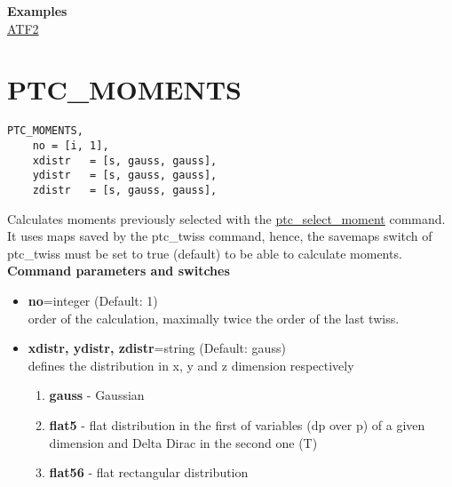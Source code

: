 {\bf Examples}\\
\href{http://cern.ch/frs/mad-X_examples/ptc_madx_interface/moments/moments.madx}{ATF2}

 
% 



%

\section{PTC\_MOMENTS}

\begin{verbatim}
PTC_MOMENTS, 
    no = [i, 1], 
    xdistr   = [s, gauss, gauss], 
    ydistr   = [s, gauss, gauss], 
    zdistr   = [s, gauss, gauss], 
\end{verbatim}

Calculates moments previously selected with the
\href{PTC_SelectMoment.html}{ptc\_select\_moment} command.  It uses maps
saved by the ptc\_twiss command, hence, the savemaps switch of
ptc\_twiss must be set to true (default) to be able to calculate
moments.  \\ 

{\bf  Command parameters and switches }
\begin{itemize}
   \item {\bf no}=integer (Default: 1)\\
     order of the calculation, maximally twice the order of the last
     twiss.
   
   \item {\bf xdistr, ydistr, zdistr}=string (Default: gauss)\\  
     defines the distribution in x, y and z dimension respectively 
     \begin{enumerate}
	\item {\bf gauss} - Gaussian
	\item {\bf flat5} - flat distribution in the first of
          variables (dp over p) of a given dimension and Delta Dirac in
          the second one (T)  
	\item {\bf flat56} - flat rectangular distribution 
     \end{enumerate}
\end{itemize}

